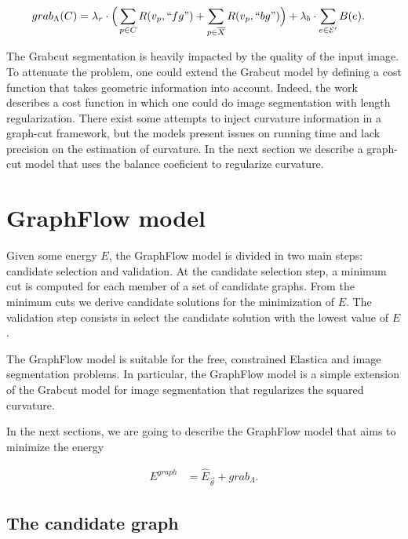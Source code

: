 \begin{align*}
	grab_{\Lambda}(C) &= \lambda_r \cdot \Big( \sum_{p \in C}{R(v_p,``fg")} + \sum_{p \in \overline{X}}{R(v_p,``bg")} \Big) + \lambda_b \cdot \sum_{e \in \mathcal{E}'}{B(e)}.
\end{align*}


The Grabcut segmentation is heavily impacted by the quality of the input image. To attenuate the problem, one could extend the Grabcut model by defining a cost function that takes geometric information into account. Indeed, the work \cite{boykov03geodesics} describes a cost function in which one could do image segmentation with length regularization. There exist some attempts \cite{nieuwenhuis14efficient,zehiry10fast} to inject curvature information in a graph-cut framework, but the models present issues on running time and lack precision on the estimation of curvature. In the next section we describe a graph-cut model that uses the balance coeficient to regularize curvature.


\section{GraphFlow model}
Given some energy $E$, the GraphFlow model is divided in two main steps: candidate selection and validation. At the candidate selection step, a minimum cut is computed for each member of a set of candidate graphs. From the minimum cuts we derive candidate solutions for the minimization of $E$. The validation step consists in select the candidate solution with the lowest value of $E$.

The GraphFlow model is suitable for the free, constrained Elastica and image segmentation problems. In particular, the GraphFlow model is a simple extension of the Grabcut model for image segmentation that regularizes the squared curvature.

In the next sections, we are going to describe the GraphFlow model that aims to minimize the energy

\begin{align}
E^{graph} &= \hat{E}_{\vec{\theta}} + grab_{\Lambda}.
\label{eq:graphflow-energy}
\end{align}


\subsection{The candidate graph}


